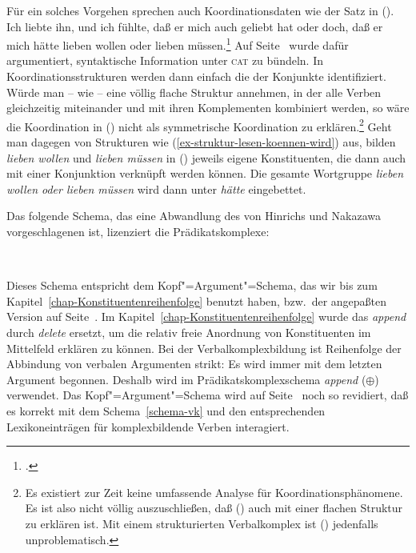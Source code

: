 Für ein solches Vorgehen sprechen auch Koordinationsdaten
wie der Satz in ().
\ea
Ich liebte ihn, und ich fühlte, daß er mich auch geliebt hat oder doch, daß er mich
hätte lieben wollen oder lieben müssen.\footnote{
        .
}
\z
Auf Seite~\pageref{page-symmetrische-koordination} wurde dafür argumentiert,
syntaktische Information unter \textsc{cat} zu bündeln. In Koordinationsstrukturen werden
dann einfach die \catwe der Konjunkte identifiziert. Würde man -- wie \zb \citet*{BvN96,BvN98a} --
eine völlig flache Struktur annehmen, in der alle Verben
gleichzeitig miteinander und mit ihren Komplementen kombiniert werden,
so wäre die Koordination in () nicht als symmetrische Koordination zu erklären.\footnote{
        Es existiert zur Zeit keine umfassende Analyse für Koordinationsphänomene. Es ist also
        nicht völlig auszuschließen, daß () auch mit einer flachen Struktur zu erklären ist.
        Mit einem strukturierten Verbalkomplex ist () jedenfalls unproblematisch.%
}
Geht man dagegen von Strukturen wie (\ref{ex-struktur-lesen-koennen-wird}) aus, bilden \emph{lieben wollen}
und \emph{lieben müssen} in () jeweils eigene Konstituenten, die dann auch mit einer Konjunktion
verknüpft werden können. Die gesamte Wortgruppe \emph{lieben wollen oder lieben müssen} wird dann unter
\emph{hätte} eingebettet.


Das folgende Schema, das eine Abwandlung des von
Hinrichs und Nakazawa vorgeschlagenen ist, lizenziert die Prädikatskomplexe:
\begin{samepage}
\begin{schema}[Prädikatskomplexschema]
\label{schema-vk}
 \impl\\
\end{schema}
\end{samepage}
%
Dieses Schema entspricht dem Kopf"=Argument"=Schema, das wir bis zum Kapitel~\ref{chap-Konstituentenreihenfolge}
benutzt haben, bzw.\ der angepaßten Version auf Seite~\pageref{schema-head-arg}.
Im Kapitel~\ref{chap-Konstituentenreihenfolge} wurde das \emph{append} durch \emph{delete}
ersetzt, um die relativ freie Anordnung von Konstituenten im Mittelfeld erklären zu können.
Bei der Verbalkomplexbildung ist Reihenfolge der Abbindung von verbalen Argumenten strikt: Es wird
immer mit dem letzten Argument begonnen. Deshalb wird im Prädikatskomplexschema \emph{append} ($\oplus$)
verwendet. Das Kopf"=Argument"=Schema wird auf Seite~\pageref{schema-bin} noch so revidiert,
daß es korrekt mit dem Schema~\ref{schema-vk} und den entsprechenden Lexikoneinträgen für komplexbildende
Verben interagiert.

